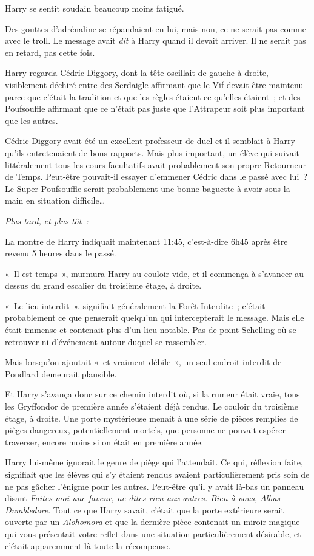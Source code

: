 Harry se sentit soudain beaucoup moins fatigué.

Des gouttes d'adrénaline se répandaient en lui, mais non, ce ne serait pas comme avec le troll. Le message avait \emph{dit} à Harry quand il devait arriver. Il ne serait pas en retard, pas cette fois.

Harry regarda Cédric Diggory, dont la tête oscillait de gauche à droite, visiblement déchiré entre des Serdaigle affirmant que le Vif devait être maintenu parce que c'était la tradition et que les règles étaient ce qu'elles étaient~; et des Poufsouffle affirmant que ce n'était pas juste que l'Attrapeur soit plus important que les autres.

Cédric Diggory avait été un excellent professeur de duel et il semblait à Harry qu'ils entretenaient de bons rapports. Mais plus important, un élève qui suivait littéralement tous les cours facultatifs avait probablement son propre Retourneur de Temps. Peut-être pouvait-il essayer d'emmener Cédric dans le passé avec lui~? Le Super Poufsouffle serait probablement une bonne baguette à avoir sous la main en situation difficile…

\later

\emph{Plus tard, et plus tôt~:}

La montre de Harry indiquait maintenant 11:45, c'est-à-dire 6h45 après être revenu 5 heures dans le passé.

«~Il est temps~», murmura Harry au couloir vide, et il commença à s'avancer au-dessus du grand escalier du troisième étage, à droite.

«~Le lieu interdit~», signifiait généralement la Forêt Interdite~; c'était probablement ce que penserait quelqu'un qui intercepterait le message. Mais elle était immense et contenait plus d'un lieu notable. Pas de point Schelling où se retrouver ni d'événement autour duquel se rassembler.

Mais lorsqu'on ajoutait «~et vraiment débile~», un seul endroit interdit de Poudlard demeurait plausible.

Et Harry s'avança donc sur ce chemin interdit où, si la rumeur était vraie, tous les Gryffondor de première année s'étaient déjà rendus. Le couloir du troisième étage, à droite. Une porte mystérieuse menait à une série de pièces remplies de pièges dangereux, potentiellement mortels, que personne ne pouvait espérer traverser, encore moins si on était en première année.

Harry lui-même ignorait le genre de piège qui l'attendait. Ce qui, réflexion faite, signifiait que les élèves qui s'y étaient rendus avaient particulièrement pris soin de ne pas gâcher l'énigme pour les autres. Peut-être qu'il y avait là-bas un panneau disant \emph{Faites-moi une faveur, ne dites rien aux autres. Bien à vous, Albus Dumbledore}. Tout ce que Harry savait, c'était que la porte extérieure serait ouverte par un \emph{Alohomora} et que la dernière pièce contenait un miroir magique qui vous présentait votre reflet dans une situation particulièrement désirable, et c'était apparemment là toute la récompense.

